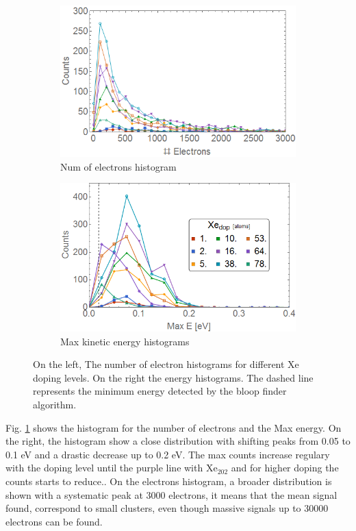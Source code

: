\begin{figure}[h!]
\hfill
\begin{subfigure}[l]{0.48\textwidth}\caption{Num of electrons histogram}
\includegraphics[width=1\textwidth]{../Images/results/MIR_Ne_XeDop_39K/HElec.png} 
\end{subfigure} 
\begin{subfigure}[l]{0.48\textwidth}\caption{Max kinetic energy histograms}
\includegraphics[width=1\textwidth]{../Images/results/MIR_Ne_XeDop_39K/HEnergc.png} 
\end{subfigure} \hfill

\caption[MIR Ne-Xe doping scan.Histograms]{On the left, The number of electron histograms for different Xe doping levels. On the right the energy histograms. The dashed line represents the minimum energy detected by the bloop finder algorithm.}
\label{fig:NeonXedophisto}
\end{figure}


Fig. \ref{fig:NeonXedophisto} shows the histogram for the number of electrons  and the Max energy. On the right, the histogram show a close distribution with shifting peaks from 0.05 to 0.1 eV and a drastic decrease up to 0.2 eV. The max counts increase regulary with the doping level until the purple line with Xe$_{202}$ and for higher doping the counts starts to reduce.. On the electrons histogram, a broader distribution is shown with a systematic peak at 3000 electrons, it means that the mean signal found, correspond to small clusters, even though  massive signals up to 30000 electrons can be found. 


